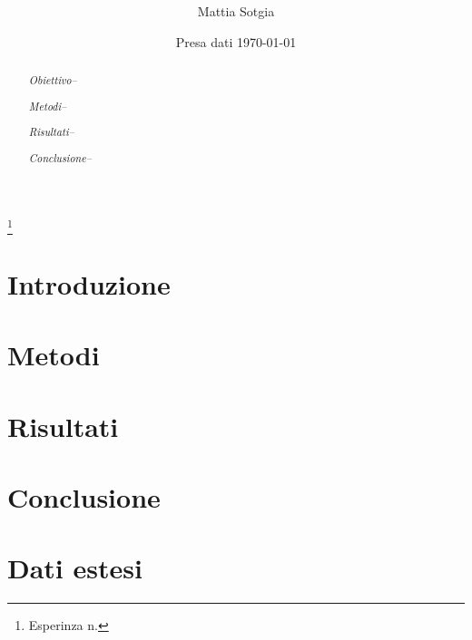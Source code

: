 \documentclass[
    reprint, 
    superscriptaddress, 
    altaffilletter, 
    amsmath, 
    amssymb, 
    a4paper]{revtex4-2}
\begin{document}
\title{
}
\thanks{
    Esperinza n. %
}

\author{Mattia Sotgia}

\date{Presa dati
    \today
}

\begin{abstract}
    \textit{Obiettivo-- }
    
    \textit{Metodi-- }
    
    \textit{Risultati-- }
        
    \textit{Conclusione-- }
        
\end{abstract}
\maketitle
\thispagestyle{fancy}


\section{Introduzione}
\label{section:introduction}


\section{Metodi}
\label{section:methods}


\section{Risultati}
\label{section:results}

\section{Conclusione}
\label{section:conclusion}

\appendix

\setcounter{table}{0}
\renewcommand{\thetable}{A-\Roman{table}}

\section{Dati estesi}
\end{document}
